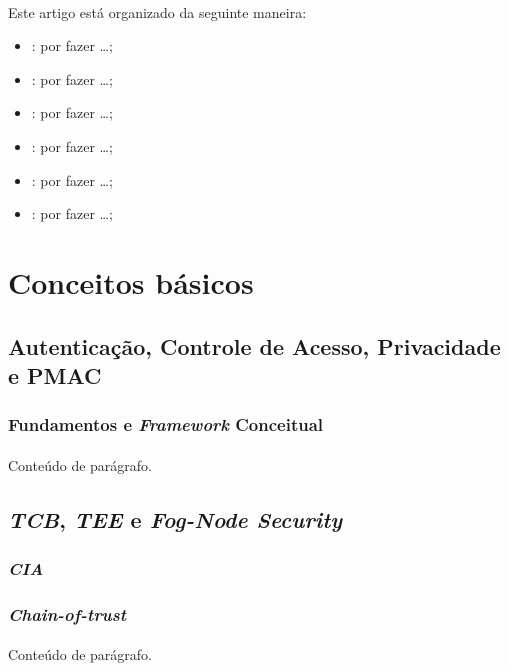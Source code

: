 \documentclass[12pt]{article}
\begin{document}
\paragraph{}
Este artigo está organizado da seguinte maneira:
\begin{itemize}
  \item {}: por fazer \dots;
  \item {}: por fazer \dots;
  \item {}: por fazer \dots;
  \item {}: por fazer \dots;
  \item {}: por fazer \dots;
  \item {}: por fazer \dots;
\end{itemize}

\section{Conceitos básicos} \label{sec:concepts}
\subsection{Autenticação, Controle de Acesso, Privacidade e PMAC}
\subsubsection{Fundamentos e \textit{Framework} Conceitual}
\paragraph{}
Conteúdo de parágrafo.

\subsection{\textit{TCB}, \textit{TEE} e \textit{Fog-Node Security}}
\subsubsection{\textit{CIA}}
\subsubsection{\textit{Chain-of-trust}}
\paragraph{}
Conteúdo de parágrafo.
\end{document}
